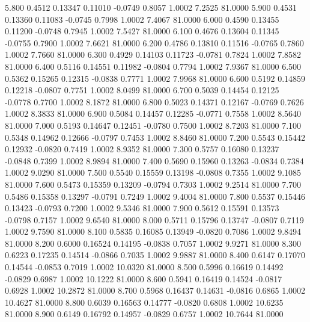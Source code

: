    5.800   0.4512   0.13347   0.11010  -0.0749   0.8057   1.0002   7.2525  81.0000
   5.900   0.4531   0.13360   0.11083  -0.0745   0.7998   1.0002   7.4067  81.0000
   6.000   0.4590   0.13455   0.11200  -0.0748   0.7945   1.0002   7.5427  81.0000
   6.100   0.4676   0.13604   0.11345  -0.0755   0.7900   1.0002   7.6621  81.0000
   6.200   0.4786   0.13810   0.11516  -0.0765   0.7860   1.0002   7.7660  81.0000
   6.300   0.4929   0.14103   0.11723  -0.0781   0.7824   1.0002   7.8582  81.0000
   6.400   0.5116   0.14551   0.11982  -0.0804   0.7794   1.0002   7.9367  81.0000
   6.500   0.5362   0.15265   0.12315  -0.0838   0.7771   1.0002   7.9968  81.0000
   6.600   0.5192   0.14859   0.12218  -0.0807   0.7751   1.0002   8.0499  81.0000
   6.700   0.5039   0.14454   0.12125  -0.0778   0.7700   1.0002   8.1872  81.0000
   6.800   0.5023   0.14371   0.12167  -0.0769   0.7626   1.0002   8.3833  81.0000
   6.900   0.5084   0.14457   0.12285  -0.0771   0.7558   1.0002   8.5640  81.0000
   7.000   0.5193   0.14647   0.12451  -0.0780   0.7500   1.0002   8.7203  81.0000
   7.100   0.5348   0.14962   0.12666  -0.0797   0.7453   1.0002   8.8460  81.0000
   7.200   0.5543   0.15442   0.12932  -0.0820   0.7419   1.0002   8.9352  81.0000
   7.300   0.5757   0.16080   0.13237  -0.0848   0.7399   1.0002   8.9894  81.0000
   7.400   0.5690   0.15960   0.13263  -0.0834   0.7384   1.0002   9.0290  81.0000
   7.500   0.5540   0.15559   0.13198  -0.0808   0.7355   1.0002   9.1085  81.0000
   7.600   0.5473   0.15359   0.13209  -0.0794   0.7303   1.0002   9.2514  81.0000
   7.700   0.5486   0.15358   0.13297  -0.0791   0.7249   1.0002   9.4004  81.0000
   7.800   0.5537   0.15446   0.13423  -0.0793   0.7200   1.0002   9.5346  81.0000
   7.900   0.5612   0.15591   0.13573  -0.0798   0.7157   1.0002   9.6540  81.0000
   8.000   0.5711   0.15796   0.13747  -0.0807   0.7119   1.0002   9.7590  81.0000
   8.100   0.5835   0.16085   0.13949  -0.0820   0.7086   1.0002   9.8494  81.0000
   8.200   0.6000   0.16524   0.14195  -0.0838   0.7057   1.0002   9.9271  81.0000
   8.300   0.6223   0.17235   0.14514  -0.0866   0.7035   1.0002   9.9887  81.0000
   8.400   0.6147   0.17070   0.14544  -0.0853   0.7019   1.0002  10.0320  81.0000
   8.500   0.5996   0.16619   0.14492  -0.0829   0.6987   1.0002  10.1222  81.0000
   8.600   0.5941   0.16419   0.14524  -0.0817   0.6928   1.0002  10.2872  81.0000
   8.700   0.5968   0.16437   0.14631  -0.0816   0.6865   1.0002  10.4627  81.0000
   8.800   0.6039   0.16563   0.14777  -0.0820   0.6808   1.0002  10.6235  81.0000
   8.900   0.6149   0.16792   0.14957  -0.0829   0.6757   1.0002  10.7644  81.0000
